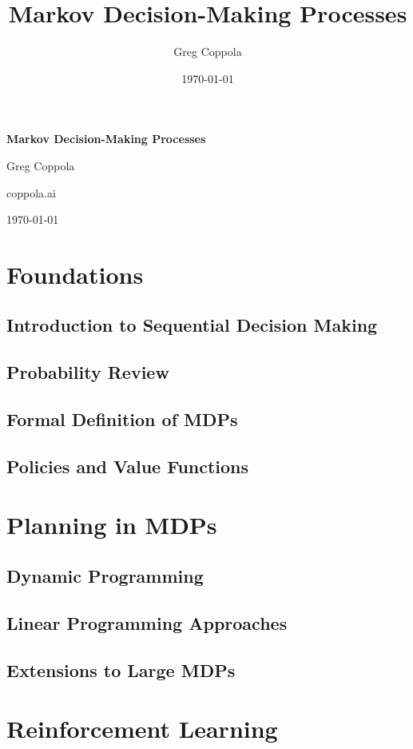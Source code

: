 \documentclass[12pt]{book}
\title{Markov Decision-Making Processes}
\author{Greg Coppola}
\date{\today}
\newcommand{\publisher}{coppola.ai}
\begin{document}
\begin{titlepage}
    \centering
    {\Huge \bfseries Markov Decision-Making Processes \par}
    \vspace{1.5cm}
    {\Large Greg Coppola \par}
    \vspace{2cm}
    {\large \publisher \par}
    \vfill
    {\large \today \par}
\end{titlepage}

\frontmatter
\tableofcontents

\mainmatter

\part{Foundations}
\chapter{Introduction to Sequential Decision Making}
\chapter{Probability Review}
\chapter{Formal Definition of MDPs}
\chapter{Policies and Value Functions}

\part{Planning in MDPs}
\chapter{Dynamic Programming}
\chapter{Linear Programming Approaches}
\chapter{Extensions to Large MDPs}

\part{Reinforcement Learning}
\end{document}
